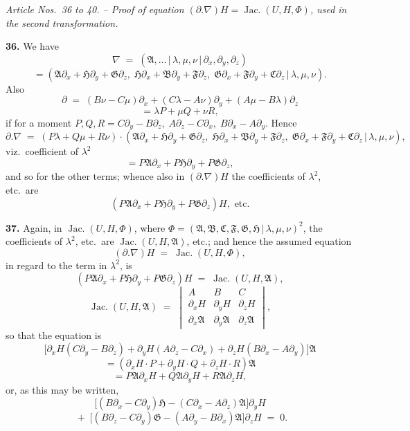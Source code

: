 \documentclass[11pt,a4paper]{article}
\providecommand{\mid}{\,|\,}
\providecommand{\Jac}{\operatorname{Jac.}}
\begin{document}
\bigskip

\begin{center}
\textit{Article Nos.\ 36 to 40. -- Proof of equation $(\partial.\nabla)H = \Jac(U,H,\Phi)$, used in the second transformation.}
\end{center}

\textbf{36.} We have
\[
\nabla \;=\; (\mathfrak{A},\ldots\mid \lambda,\mu,\nu\mid \partial_x,\partial_y,\partial_z)
\]
\[
= (\mathfrak{A}\partial_x + \mathfrak{H}\partial_y + \mathfrak{G}\partial_z,\; \mathfrak{H}\partial_x + \mathfrak{B}\partial_y + \mathfrak{F}\partial_z,\; \mathfrak{G}\partial_x + \mathfrak{F}\partial_y + \mathfrak{C}\partial_z\mid \lambda,\mu,\nu).
\]
Also
\[
\partial \;=\; (B\nu - C\mu)\partial_x + (C\lambda - A\nu)\partial_y + (A\mu - B\lambda)\partial_z
\]
\[
= \lambda P + \mu Q + \nu R,
\]
if for a moment $P,Q,R = C\partial_y - B\partial_z,\; A\partial_z - C\partial_x,\; B\partial_x - A\partial_y$. Hence
\[
\partial.\nabla \;=\; (P\lambda + Q\mu + R\nu)\cdot(\mathfrak{A}\partial_x + \mathfrak{H}\partial_y + \mathfrak{G}\partial_z,\; \mathfrak{H}\partial_x + \mathfrak{B}\partial_y + \mathfrak{F}\partial_z,\; \mathfrak{G}\partial_x + \mathfrak{F}\partial_y + \mathfrak{C}\partial_z\mid \lambda,\mu,\nu),
\]
viz.\ coefficient of $\lambda^2$
\[
= P\mathfrak{A}\partial_x + P\mathfrak{H}\partial_y + P\mathfrak{G}\partial_z,
\]
and so for the other terms; whence also in $(\partial.\nabla)H$ the coefficients of $\lambda^2$, etc.\ are
\[
(P\mathfrak{A}\partial_x + P\mathfrak{H}\partial_y + P\mathfrak{G}\partial_z)H, \text{ etc.}
\]

\textbf{37.} Again, in $\Jac(U,H,\Phi)$, where $\Phi = (\mathfrak{A},\mathfrak{B},\mathfrak{C},\mathfrak{F},\mathfrak{G},\mathfrak{H}\mid\lambda,\mu,\nu)^2$, the coefficients of $\lambda^2$, etc.\ are $\Jac(U,H,\mathfrak{A})$, etc.; and hence the assumed equation
\[
(\partial.\nabla)H \;=\; \Jac(U,H,\Phi),
\]
in regard to the term in $\lambda^2$, is
\[
(P\mathfrak{A}\partial_x + P\mathfrak{H}\partial_y + P\mathfrak{G}\partial_z)H \;=\; \Jac(U,H,\mathfrak{A}),
\]
\[
\Jac(U,H,\mathfrak{A}) \;=\; \begin{vmatrix} A & B & C \\ \partial_x H & \partial_y H & \partial_z H \\ \partial_x \mathfrak{A} & \partial_y \mathfrak{A} & \partial_z \mathfrak{A} \end{vmatrix},
\]
so that the equation is
\[
\bigl[\partial_x H(C\partial_y - B\partial_z) + \partial_y H(A\partial_z - C\partial_x) + \partial_z H(B\partial_x - A\partial_y)\bigr]\mathfrak{A}
\]
\[
= (\partial_x H\cdot P + \partial_y H\cdot Q + \partial_z H\cdot R)\mathfrak{A}
\]
\[
= P\mathfrak{A}\partial_x H + Q\mathfrak{A}\partial_y H + R\mathfrak{A}\partial_z H,
\]
or, as this may be written,
\[
\bigl[(B\partial_x - C\partial_y)\mathfrak{H} - (C\partial_x - A\partial_z)\mathfrak{A}\bigr]\partial_y H
\]
\[
\;+\; \bigl[(B\partial_z - C\partial_y)\mathfrak{G} - (A\partial_y - B\partial_x)\mathfrak{A}\bigr]\partial_z H \;=\; 0.
\]
\end{document}
